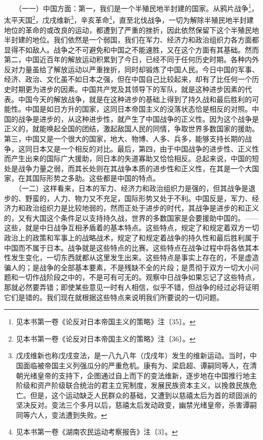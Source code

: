 \documentclass[cn,11pt,chinese]{elegantbook}
\begin{document}
　　（一一）中国方面：第一，我们是一个半殖民地半封建的国家。从鸦片战争\footnote[10]{ 见本书第一卷《论反对日本帝国主义的策略》注〔35〕。}，太平天国\footnote[11]{ 见本书第一卷《论反对日本帝国主义的策略》注〔36〕。}，戊戌维新\footnote[12]{ 戊戌维新也称戊戌变法，是一八九八年（戊戌年）发生的维新运动。当时，中国面临被帝国主义列强瓜分的严重危机。康有为、梁启超、谭嗣同等人，在清朝光绪皇帝的支持下，企图通过自上而下的变法维新，逐步地在中国推行地主阶级和资产阶级联合统治的君主立宪制度，发展民族资本主义，以挽救民族危亡。但是，这个运动缺乏人民群众的基础，又遭到以慈禧太后为首的顽固派的坚决反对。变法三个多月以后，慈禧太后发动政变，幽禁光绪皇帝，杀害谭嗣同等六人，变法遭到失败。}，辛亥革命\footnote[13]{ 见本书第一卷《湖南农民运动考察报告》注〔3〕。}，直至北伐战争，一切为解除半殖民地半封建地位的革命的或改良的运动，都遭到了严重的挫折，因此依然保留下这个半殖民地半封建的地位。我们依然是一个弱国，我们在军力、经济力和政治组织力各方面都显得不如敌人。战争之不可避免和中国之不能速胜，又在这个方面有其基础。然而第二，中国近百年的解放运动积累到了今日，已经不同于任何历史时期。各种内外反对力量虽给了解放运动以严重挫折，同时却锻炼了中国人民。今日中国的军事、经济、政治、文化虽不如日本之强，但在中国自己比较起来，却有了比任何一个历史时期更为进步的因素。中国共产党及其领导下的军队，就是这种进步因素的代表。中国今天的解放战争，就是在这种进步的基础上得到了持久战和最后胜利的可能性。中国是如日方升的国家，这同日本帝国主义的没落状态恰是相反的对照。中国的战争是进步的，从这种进步性，就产生了中国战争的正义性。因为这个战争是正义的，就能唤起全国的团结，激起敌国人民的同情，争取世界多数国家的援助。第三，中国又是一个很大的国家，地大、物博、人多、兵多，能够支持长期的战争，这同日本又是一个相反的对比。最后，第四，由于中国战争的进步性、正义性而产生出来的国际广大援助，同日本的失道寡助又恰恰相反。总起来说，中国的短处是战争力量之弱，而其长处则在其战争本质的进步性和正义性，在其是一个大国家，在其国际形势之多助。这些都是中国的特点。\\
　　（一二）这样看来，日本的军力、经济力和政治组织力是强的，但其战争是退步的、野蛮的，人力、物力又不充足，国际形势又处于不利。中国反是，军力、经济力和政治组织力是比较地弱的，然而正处于进步的时代，其战争是进步的和正义的，又有大国这个条件足以支持持久战，世界的多数国家是会要援助中国的。——这些，就是中日战争互相矛盾着的基本特点。这些特点，规定了和规定着双方一切政治上的政策和军事上的战略战术，规定了和规定着战争的持久性和最后胜利属于中国而不属于日本。战争就是这些特点的比赛。这些特点在战争过程中将各依其本性发生变化，一切东西就都从这里发生出来。这些特点是事实上存在的，不是虚造骗人的；是战争的全部基本要素，不是残缺不全的片段；是贯彻于双方一切大小问题和一切作战阶段之中的，不是可有可无的。观察中日战争如果忘记了这些特点，那就必然要弄错；即使某些意见一时有人相信，似乎不错，但战争的经过必将证明它们是错的。我们现在就根据这些特点来说明我们所要说的一切问题。\\
\end{document}
